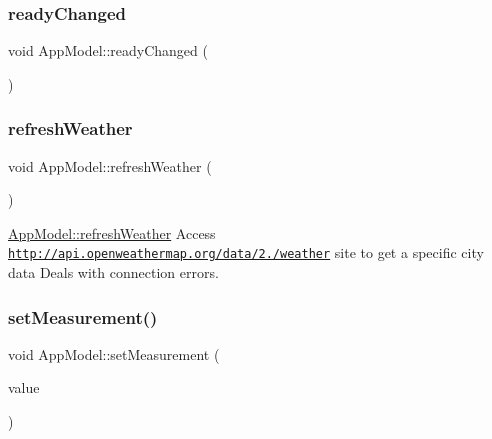 \mbox{\label{class_app_model_a574c2bd6f5c92ac9268107f8399989cb}} 
\subsubsection{\texorpdfstring{ready\+Changed}{readyChanged}}
{\footnotesize\ttfamily void App\+Model\+::ready\+Changed (\begin{DoxyParamCaption}{ }\end{DoxyParamCaption})\hspace{0.3cm}{\ttfamily [signal]}}

\mbox{\label{class_app_model_a37e1da9d028779f7f0fc908e4c04fa76}} 
\subsubsection{\texorpdfstring{refresh\+Weather}{refreshWeather}}
{\footnotesize\ttfamily void App\+Model\+::refresh\+Weather (\begin{DoxyParamCaption}{ }\end{DoxyParamCaption})\hspace{0.3cm}{\ttfamily [slot]}}



\hyperlink{class_app_model_a37e1da9d028779f7f0fc908e4c04fa76}{App\+Model\+::refresh\+Weather} Access \href{http://api.openweathermap.org/data/2.5/weather}{\tt http\+://api.\+openweathermap.\+org/data/2./weather} site to get a specific city data Deals with connection errors. 

\mbox{\label{class_app_model_af8e28b32ab4d33c6f10bcab5d9c5b25c}} 
\subsubsection{\texorpdfstring{set\+Measurement()}{setMeasurement()}}
{\footnotesize\ttfamily void App\+Model\+::set\+Measurement (\begin{DoxyParamCaption}\item[{const \hyperlink{class_metrics_average}{Metrics\+Average} \&}]{value }\end{DoxyParamCaption})}

